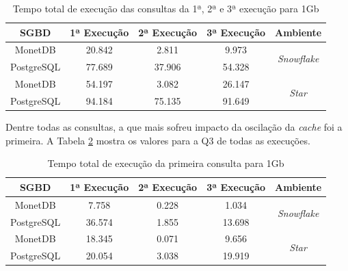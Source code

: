 \begin{table}[htpb]
        \centering
        \caption{Tempo total de execução das consultas da 1ª, 2ª e 3ª execução para 1Gb}
        \label{tab:queries_cache_1}
        \begin{tabular}{|c|c|c|c|c|}
        \hline
        SGBD       & 1ª Execução & 2ª Execução & 3ª Execução & Ambiente                            \\ \hline
        MonetDB    & 20.842      & 2.811       & 9.973       & \multirow{2}{*}{\textit{Snowflake}} \\ \cline{1-4}
        PostgreSQL & 77.689      & 37.906      & 54.328      &                                     \\ \hline
        MonetDB    & 54.197      & 3.082       & 26.147      & \multirow{2}{*}{\textit{Star}}      \\ \cline{1-4}
        PostgreSQL & 94.184      & 75.135      & 91.649      &                                     \\ \hline
        \end{tabular}
\end{table}

Dentre todas as consultas, a que mais sofreu impacto da oscilação da \textit{cache} foi a primeira. A Tabela \ref{tab:q1_cache_1} mostra os valores para a Q3 de todas as execuções.

\begin{table}[htpb]
        \centering
        \caption{Tempo total de execução da primeira consulta para 1Gb}
        \label{tab:q1_cache_1}
        \begin{tabular}{|c|c|c|c|c|}
        \hline
        SGBD       & 1ª Execução & 2ª Execução & 3ª Execução & Ambiente                            \\ \hline
        MonetDB    & 7.758       & 0.228       & 1.034       & \multirow{2}{*}{\textit{Snowflake}} \\ \cline{1-4}
        PostgreSQL & 36.574      & 1.855       & 13.698      &                                     \\ \hline
        MonetDB    & 18.345      & 0.071       & 9.656       & \multirow{2}{*}{\textit{Star}}      \\ \cline{1-4}
        PostgreSQL & 20.054      & 3.038       & 19.919      &                                     \\ \hline
\end{tabular}
\end{table}


